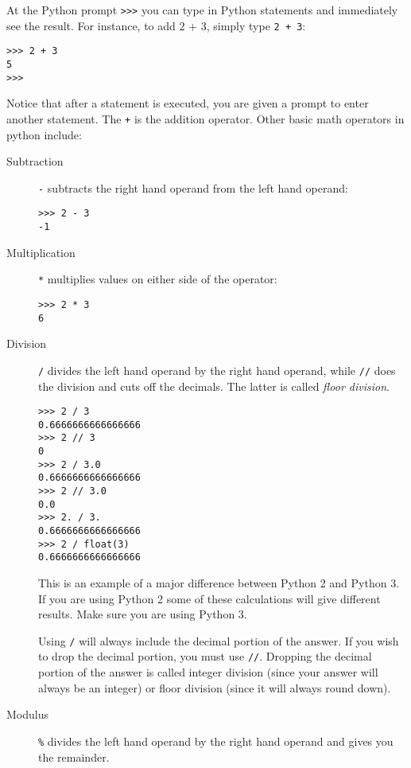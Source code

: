 \documentclass[12pt,hidelinks]{article}
\begin{document}
At the Python prompt \texttt{>>>} you can type in Python statements and
immediately see the result. For instance, to add 2 + 3, simply type \texttt{2 +
3}: 
\begin{lstlisting}[style=bash]
>>> 2 + 3
5
>>>
\end{lstlisting}

Notice that after a statement is executed, you are given a prompt to enter
another statement. The \texttt{+} is the addition operator. Other basic math
operators in python include:

\begin{description}
  \item[Subtraction] \texttt{-} subtracts the right hand operand from the left
    hand operand:
    \begin{lstlisting}[style=bash]
>>> 2 - 3
-1
    \end{lstlisting}

  \item[Multiplication] \texttt{*} multiplies values on either side of the
    operator:

    \begin{lstlisting}[style=bash]
>>> 2 * 3
6
    \end{lstlisting}

  \item[Division] \texttt{/} divides the left hand operand by the right hand
    operand, while \texttt{//} does the division and cuts off the decimals. The
    latter is called \emph{floor division}.

  \begin{lstlisting}[style=bash]
>>> 2 / 3
0.6666666666666666
>>> 2 // 3
0
>>> 2 / 3.0
0.6666666666666666
>>> 2 // 3.0
0.0
>>> 2. / 3.
0.6666666666666666
>>> 2 / float(3)
0.6666666666666666
  \end{lstlisting}

    This is an example of a major difference between Python 2 and Python 3. If
    you are using Python 2 some of these calculations will give different
    results. Make sure you are using Python 3.

    Using \texttt{/} will always include the decimal portion of the answer. If
    you wish to drop the decimal portion, you must use \texttt{//}. Dropping the
    decimal portion of the answer is called integer division (since your answer
    will always be an integer) or floor division (since it will always round
    down).

  \item[Modulus] \texttt{\%} divides the left hand operand by the right hand
    operand and gives you the remainder.


\end{description}
\end{document}
